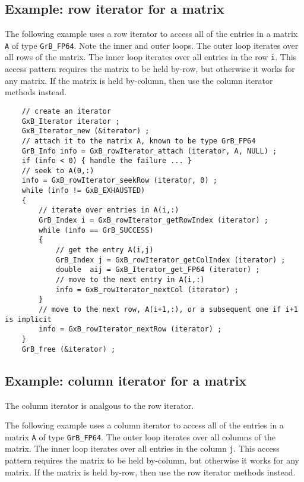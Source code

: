\documentclass[12pt]{article}
\begin{document}
\subsection{Example: row iterator for a matrix}

The following example uses a row iterator to access all of the entries
in a matrix \verb'A' of type \verb'GrB_FP64'.  Note the inner and outer loops.
The outer loop iterates over all rows of the matrix.  The inner loop iterates
over all entries in the row \verb'i'.  This access pattern requires the matrix
to be held by-row, but otherwise it works for any matrix.  If the matrix is
held by-column, then use the column iterator methods instead.

    {\footnotesize
    \begin{verbatim}
    // create an iterator
    GxB_Iterator iterator ;
    GxB_Iterator_new (&iterator) ;
    // attach it to the matrix A, known to be type GrB_FP64
    GrB_Info info = GxB_rowIterator_attach (iterator, A, NULL) ;
    if (info < 0) { handle the failure ... }
    // seek to A(0,:)
    info = GxB_rowIterator_seekRow (iterator, 0) ;
    while (info != GxB_EXHAUSTED)
    {
        // iterate over entries in A(i,:)
        GrB_Index i = GxB_rowIterator_getRowIndex (iterator) ;
        while (info == GrB_SUCCESS)
        {
            // get the entry A(i,j)
            GrB_Index j = GxB_rowIterator_getColIndex (iterator) ;
            double  aij = GxB_Iterator_get_FP64 (iterator) ;
            // move to the next entry in A(i,:)
            info = GxB_rowIterator_nextCol (iterator) ;
        }
        // move to the next row, A(i+1,:), or a subsequent one if i+1 is implicit
        info = GxB_rowIterator_nextRow (iterator) ;
    }
    GrB_free (&iterator) ; \end{verbatim}}

\newpage
\subsection{Example: column iterator for a matrix}

The column iterator is analgous to the row iterator.

The following example uses a column iterator to access all of the entries in a
matrix \verb'A' of type \verb'GrB_FP64'.  The outer loop iterates over all
columns of the matrix.  The inner loop iterates over all entries in the column
\verb'j'.  This access pattern requires the matrix to be held by-column, but
otherwise it works for any matrix.  If the matrix is held by-row, then use
the row iterator methods instead.
\end{document}
